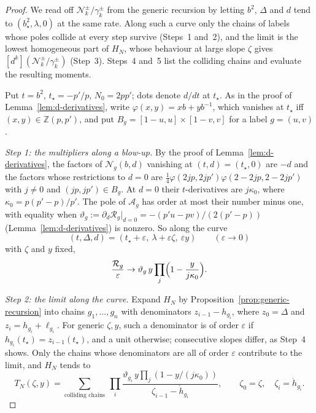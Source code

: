 \documentclass[twoside,10pt]{article}
\numberwithin{equation}{section}
\theoremstyle{slbody}
\theoremstyle{definition}
\theoremstyle{remark}
\begin{document}
\begin{proof}
We read off \(\mathcal N^\pm_k/\gamma^\pm_k\) from the generic recursion by letting
\(b^2\), \(\Delta\) and \(d\) tend to \((b_\star^2,\lambda,0)\) at the same
rate.  Along such a curve only the chains of labels whose poles collide at
every step survive (Steps~1 and~2), and the limit is the lowest homogeneous
part of \(H_N\), whose behaviour at large slope \(\zeta\) gives
\([d^k](\mathcal N^\pm_k/\gamma^\pm_k)\) (Step~3).  Steps~4 and~5 list the colliding
chains and evaluate the resulting moments.

Put \(t=b^2\), \(t_\star=-p'/p\), \(N_0=2pp'\); dots denote \(d/dt\) at
\(t_\star\).  As in the proof of Lemma~\ref{lem:d-derivatives}, write
\(\varphi(x,y)=xb+yb^{-1}\), which vanishes at \(t_\star\) iff
\((x,y)\in\mathbb Z(p,p')\), and put \(B_g=[1-u,u]\times[1-v,v]\) for a label
\(g=(u,v)\).

\emph{Step 1: the multipliers along a blow-up.}  By the proof of
Lemma~\ref{lem:d-derivatives}, the factors of \({\mathcal N}_g(b,d)\) vanishing
at \((t,d)=(t_\star,0)\) are \(-d\) and the factors whose restrictions to
\(d=0\) are \(\frac14\varphi(2jp,2jp')\varphi(2-2jp,2-2jp')\) with \(j\neq0\)
and \((jp,jp')\in B_g\).  At \(d=0\) their \(t\)-derivatives are
\(j\kappa_0\), where \(\kappa_0=p(p'-p)/p'\).  The pole of \({\mathcal A}_g\)
has order at most their number minus one, with equality when
\(\vartheta_g:=\partial_d{\mathcal R}_g|_{d=0}=-(p'u-pv)/(2(p'-p))\)
(Lemma~\ref{lem:d-derivatives}) is nonzero.  So along the curve
\[
 (t,\Delta,d)=(t_\star+\varepsilon,\ \lambda+\varepsilon\zeta,\ \varepsilon y)
 \qquad(\varepsilon\to0)
\]
with \(\zeta\) and \(y\) fixed,
\[
 \frac{{\mathcal R}_g}{\varepsilon}\to\vartheta_g\,y\prod_j\Bigl(1-\frac{y}{j\kappa_0}\Bigr).
\]

\emph{Step 2: the limit along the curve.}  Expand \(H_N\) by
Proposition~\ref{prop:generic-recursion} into chains \(g_1,\dots,g_n\) with
denominators \(z_{i-1}-h_{g_i}\), where \(z_0=\Delta\) and
\(z_i=h_{g_i}+\ell_{g_i}\).  For generic \(\zeta,y\), such a denominator is of
order \(\varepsilon\) if \(h_{g_i}(t_\star)=z_{i-1}(t_\star)\), and a unit
otherwise; consecutive slopes differ, as Step~4 shows.  Only the chains whose
denominators are all of order \(\varepsilon\) contribute to the limit, and \(H_N\)
tends to
\[
 T_N(\zeta,y)=\sum_{\text{colliding chains}}\ \prod_i
 \frac{\vartheta_{g_i}\,y\prod_j(1-y/(j\kappa_0))}{\zeta_{i-1}-\dot h_{g_i}},
 \qquad \zeta_0=\zeta,\quad\zeta_i=\dot h_{g_i}.
\]


\end{proof}
\end{document}
